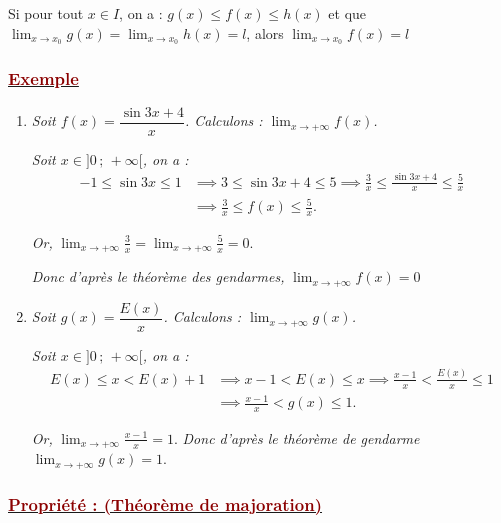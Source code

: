 \documentclass[12pt,a4paper]{article}
\begin{document}
Si pour tout $x \in I$, on a : $g(x) \le f(x) \le h(x)$ et que $\displaystyle \lim_{x \to x_0} g(x) = \lim_{x \to x_0} h(x) = l$, alors $\displaystyle \lim_{x \to x_0} f(x) = l$

\subsubsection*{\underline{\textcolor{darkred}{ Exemple }}}
\begin{enumerate}
    \item \textit{Soit $f(x) = \dfrac{\sin 3x + 4}{x}$. Calculons : $\displaystyle \lim_{x \to +\infty} f(x)$.}
    
    \textit{Soit $x \in ]0 \,;\, +\infty[$, on a :}
    \begin{align*}
        -1 \le \sin 3x \le 1 &\implies 3 \le \sin 3x + 4 \le 5 \implies \frac{3}{x} \le \frac{\sin 3x + 4}{x} \le \frac{5}{x} \\
        &\implies \frac{3}{x} \le f(x) \le \frac{5}{x}.
    \end{align*}

    \textit{Or, } $\displaystyle \lim_{x \to +\infty} \frac{3}{x} = \lim_{x \to +\infty} \frac{5}{x} = 0$.

    \textit{Donc d'après le théorème des gendarmes, } $\displaystyle \lim_{x \to +\infty} f(x) = 0$

    \vspace{0.6cm}

    \item \textit{Soit $g(x) = \dfrac{E(x)}{x}$. Calculons : $\displaystyle \lim_{x \to +\infty} g(x)$.}

    \textit{Soit $x \in ]0 \,;\, +\infty[$, on a :}
    \begin{align*}
        E(x) \le x < E(x) + 1 &\implies x - 1 < E(x) \le x \implies \frac{x - 1}{x} < \frac{E(x)}{x} \le 1 \\
        &\implies \frac{x - 1}{x} < g(x) \le 1.
    \end{align*}

    \textit{Or, } $\displaystyle \lim_{x \to +\infty} \frac{x - 1}{x} = 1$. \textit{Donc d'après le théorème de gendarme } $\displaystyle \lim_{x \to +\infty} g(x) = 1$.
\end{enumerate}

\subsubsection*{\underline{\textcolor{darkred}{ Propriété : (Théorème de majoration) }}}
\end{document}
